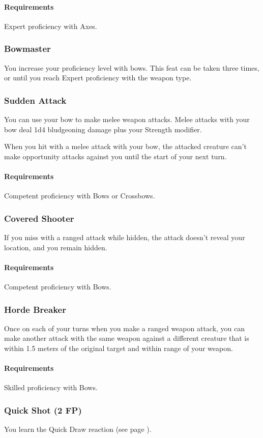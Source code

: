     \paragraph{Requirements} Expert proficiency with Axes.
\subsubsection{Bowmaster} \label{feat::bowmaster}
    You increase your proficiency level with bows.
    This feat can be taken three times, or until you reach Expert proficiency with the weapon type.
\subsubsection{Sudden Attack} \label{feat::suddenattack}
    You can use your bow to make melee weapon attacks.
    Melee attacks with your bow deal 1d4 bludgeoning damage plus your Strength modifier.

    When you hit with a melee attack with your bow, the attacked creature can't make opportunity attacks against you until the start of your next turn.
    \paragraph{Requirements} Competent proficiency with Bows or Crossbows.
\subsubsection{Covered Shooter} \label{feat::coveredshooter}
    If you miss with a ranged attack while hidden, the attack doesn't reveal your location, and you remain hidden.
    \paragraph{Requirements} Competent proficiency with Bows.
\subsubsection{Horde Breaker} \label{feat::hordebreaker}
    Once on each of your turns when you make a ranged weapon attack, you can make another attack with the same weapon against a different creature that is within 1.5 meters of the original target and within range of your weapon.
    \paragraph{Requirements} Skilled proficiency with Bows.
\subsubsection{Quick Shot (2 FP)} \label{feat::quickshot}
    You learn the Quick Draw reaction (see page \pageref{act::quickdraw}).

